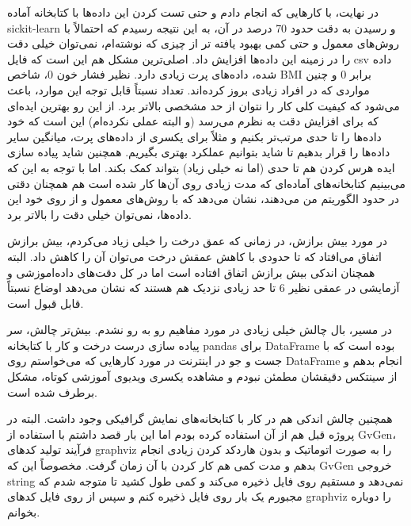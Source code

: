\documentclass[12pt,titlepage,a4page , tikz , multi,table , svgnames,xcdraw]{article}
\begin{document}
در نهایت، با کارهایی که انجام دادم و حتی تست کردن این داده‌ها با کتابخانه آماده sickit-learn و رسیدن به دقت حدود 70 درصد در آن، به این نتیجه رسیدم که احتمالاً با روش‌های معمول و حتی کمی بهبود یافته تر از چیزی که نوشته‌ام، نمی‌توان خیلی دقت را در زمینه این داده‌ها افزایش داد. اصلی‌ترین مشکل هم این است که فایل csv داده شده، داده‌های پرت زیادی دارد. نظیر فشار خون $0$، شاخص BMI برابر $0$ و چنین مواردی که در افراد زیادی بروز کرده‌اند. تعداد نسبتاً قابل توجه این موارد، باعث می‌شود که کیفیت کلی کار را نتوان از حد مشخصی بالاتر برد. از این رو بهترین ایده‌ای که برای افزایش دقت به نظرم می‌رسد (و البته عملی نکرده‌ام) این است که خود داده‌ها را تا حدی مرتب‌تر بکنیم و مثلاً برای یکسری از داده‌های پرت، میانگین سایر داده‌ها را قرار بدهیم تا شاید بتوانیم عملکرد بهتری بگیریم. همچنین شاید پیاده سازی ایده هرس کردن هم تا حدی (اما نه خیلی زیاد) بتواند کمک بکند. اما با توجه به این که می‌بینیم کتابخانه‌های آماده‌ای که مدت زیادی روی آن‌ها کار شده است هم همچنان دقتی در حدود الگوریتم من می‌دهند، نشان می‌دهد که با روش‌های معمول و از روی خود این داده‌ها، نمی‌توان خیلی دقت را بالاتر برد.

در مورد بیش برازش، در زمانی که عمق درخت را خیلی زیاد می‌کردم، بیش برازش اتفاق می‌افتاد که تا حدودی با کاهش عمقش درخت می‌توان آن را کاهش داد. البته همچنان اندکی بیش برازش اتفاق افتاده است اما در کل دقت‌های داده‌اموزشی و آزمایشی در عمقی نظیر 6 تا حد زیادی نزدیک هم هستند که نشان می‌دهد اوضاع نسبتاً قابل قبول است.

در مسیر، بال چالش خیلی زیادی در مورد مفاهیم رو به رو نشدم. بیش‌تر چالش، سر پیاده سازی درست درخت و کار با کتابخانه pandas برای DataFrame بوده است که با جست و جو در اینترنت در مورد کارهایی که می‌خواستم روی DataFrame انجام بدهم و از سینتکس دقیقشان مطمئن نبودم و مشاهده یکسری ویدیوی آموزشی کوتاه، مشکل برطرف شده است.

همچنین چالش اندکی هم در کار با کتابخانه‌های نمایش گرافیکی وجود داشت. البته در پروژه قبل هم از آن استفاده کرده بودم اما این بار قصد داشتم با استفاده از GvGen، فرآیند تولید کدهای graphviz را به صورت اتوماتیک و بدون هاردکد کردن زیادی انجام بدهم و مدت کمی هم کار کردن با آن زمان گرفت. مخصوصاً این که GvGen خروجی string نمی‌دهد و مستقیم روی فایل ذخیره می‌کند و کمی طول کشید تا متوجه شدم که مجبورم یک بار روی فایل ذخیره کنم و سپس از روی فایل کدهای graphviz را دوباره بخوانم.
\end{document}
